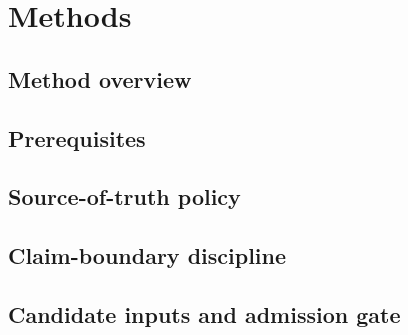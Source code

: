 \section{Methods}\label{sec:methods}


\subsection{Method overview}\label{subsec:method-overview}


\subsection{Prerequisites}\label{subsec:method-prerequisites}


\subsection{Source-of-truth policy}\label{subsec:source-policy}


\subsection{Claim-boundary discipline}\label{subsec:claim-boundary-discipline}


\subsection{Candidate inputs and admission gate}\label{subsec:candidate-admission}


